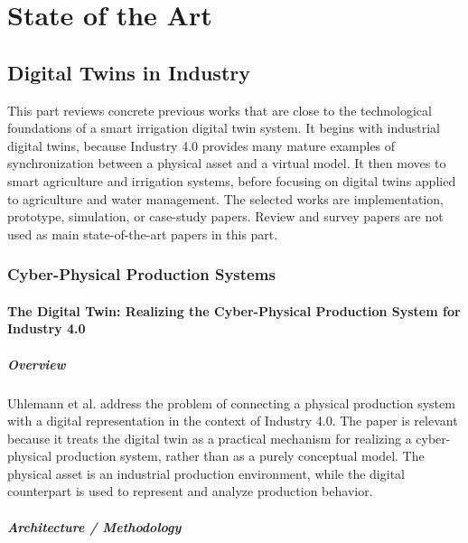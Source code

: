 \part{State of the Art}

\chapter{Digital Twins in Industry}

This part reviews concrete previous works that are close to the technological foundations of a smart irrigation digital twin system. It begins with industrial digital twins, because Industry 4.0 provides many mature examples of synchronization between a physical asset and a virtual model. It then moves to smart agriculture and irrigation systems, before focusing on digital twins applied to agriculture and water management. The selected works are implementation, prototype, simulation, or case-study papers. Review and survey papers are not used as main state-of-the-art papers in this part.

\section{Cyber-Physical Production Systems}

\subsection[The Digital Twin: Realizing the Cyber-Physical Production System for Industry 4.0]{The Digital Twin: Realizing the Cyber-Physical Production System for Industry 4.0 \cite{uhlemann2017digitalTwinCPPS}}

\subsubsection{Overview}

Uhlemann et al. address the problem of connecting a physical production system with a digital representation in the context of Industry 4.0. The paper is relevant because it treats the digital twin as a practical mechanism for realizing a cyber-physical production system, rather than as a purely conceptual model. The physical asset is an industrial production environment, while the digital counterpart is used to represent and analyze production behavior.

\subsubsection{Architecture / Methodology}

